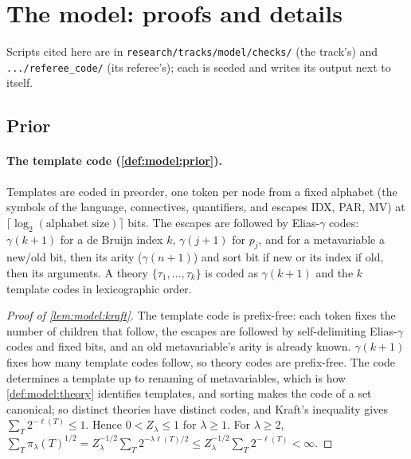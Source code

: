 \section{The model: proofs and details}\label{app:model}

\providecommand{\crefabbrev}{}%
Scripts cited here are in \texttt{research/tracks/model/checks/} (the track's) and \texttt{.../referee\_code/} (its referee's); each is seeded and writes its output next to itself.

\subsection{Prior}\label{app:model:prior}

\paragraph{The template code (\cref{def:model:prior}).} Templates are coded in preorder, one token per node from a fixed alphabet (the symbols of the language, connectives, quantifiers, and escapes IDX, PAR, MV) at $\lceil\log_2(\text{alphabet size})\rceil$ bits. The escapes are followed by Elias-$\gamma$ codes: $\gamma(k+1)$ for a de Bruijn index $k$, $\gamma(j+1)$ for $p_j$, and for a metavariable a new/old bit, then its arity ($\gamma(n+1)$) and sort bit if new or its index if old, then its arguments. A theory $\{\tau_1,\dots,\tau_k\}$ is coded as $\gamma(k+1)$ and the $k$ template codes in lexicographic order.

\begin{proof}[Proof of \cref{lem:model:kraft}]
The template code is prefix-free: each token fixes the number of children that follow, the escapes are followed by self-delimiting Elias-$\gamma$ codes and fixed bits, and an old metavariable's arity is already known. $\gamma(k+1)$ fixes how many template codes follow, so theory codes are prefix-free. The code determines a template up to renaming of metavariables, which is how \cref{def:model:theory} identifies templates, and sorting makes the code of a set canonical; so distinct theories have distinct codes, and Kraft's inequality gives $\sum_T2^{-\ell(T)}\le1$. Hence $0<Z_\lambda\le1$ for $\lambda\ge1$. For $\lambda\ge2$, $\sum_T\pi_\lambda(T)^{1/2}=Z_\lambda^{-1/2}\sum_T2^{-\lambda\ell(T)/2}\le Z_\lambda^{-1/2}\sum_T2^{-\ell(T)}<\infty$.
\end{proof}

